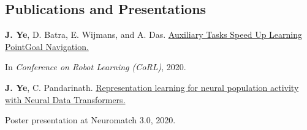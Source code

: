 \subsection*{Publications and Presentations}
    \textbf{J. Ye}, D. Batra, E. Wijmans, and A. Das.
    \href{https://arxiv.org/abs/2007.04561}
    {Auxiliary Tasks Speed Up Learning PointGoal Navigation.}

    In \emph{Conference on Robot Learning (CoRL)}, 2020.

    \textbf{J. Ye}, C. Pandarinath. \href{https://www.youtube.com/watch?v=lEXSdoIGNWY}
    {Representation learning for neural population activity with Neural Data Transformers.}

    Poster presentation at Neuromatch 3.0, 2020.
